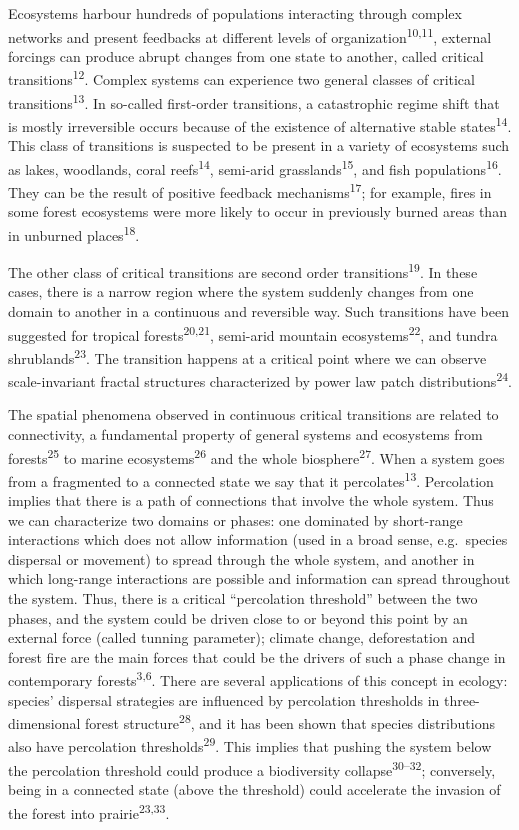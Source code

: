 \documentclass[]{article}
\begin{document}
Ecosystems harbour hundreds of populations interacting through complex
networks and present feedbacks at different levels of
organization\textsuperscript{10,11}, external forcings can produce
abrupt changes from one state to another, called critical
transitions\textsuperscript{12}. Complex systems can experience two
general classes of critical transitions\textsuperscript{13}. In
so-called first-order transitions, a catastrophic regime shift that is
mostly irreversible occurs because of the existence of alternative
stable states\textsuperscript{14}. This class of transitions is
suspected to be present in a variety of ecosystems such as lakes,
woodlands, coral reefs\textsuperscript{14}, semi-arid
grasslands\textsuperscript{15}, and fish
populations\textsuperscript{16}. They can be the result of positive
feedback mechanisms\textsuperscript{17}; for example, fires in some
forest ecosystems were more likely to occur in previously burned areas
than in unburned places\textsuperscript{18}.

The other class of critical transitions are second order
transitions\textsuperscript{19}. In these cases, there is a narrow
region where the system suddenly changes from one domain to another in a
continuous and reversible way. Such transitions have been suggested for
tropical forests\textsuperscript{20,21}, semi-arid mountain
ecosystems\textsuperscript{22}, and tundra
shrublands\textsuperscript{23}. The transition happens at a critical
point where we can observe scale-invariant fractal structures
characterized by power law patch distributions\textsuperscript{24}.

The spatial phenomena observed in continuous critical transitions are
related to connectivity, a fundamental property of general systems and
ecosystems from forests\textsuperscript{25} to marine
ecosystems\textsuperscript{26} and the whole
biosphere\textsuperscript{27}. When a system goes from a fragmented to a
connected state we say that it percolates\textsuperscript{13}.
Percolation implies that there is a path of connections that involve the
whole system. Thus we can characterize two domains or phases: one
dominated by short-range interactions which does not allow information
(used in a broad sense, e.g.~species dispersal or movement) to spread
through the whole system, and another in which long-range interactions
are possible and information can spread throughout the system. Thus,
there is a critical ``percolation threshold'' between the two phases,
and the system could be driven close to or beyond this point by an
external force (called tunning parameter); climate change, deforestation
and forest fire are the main forces that could be the drivers of such a
phase change in contemporary forests\textsuperscript{3,6}. There are
several applications of this concept in ecology: species' dispersal
strategies are influenced by percolation thresholds in three-dimensional
forest structure\textsuperscript{28}, and it has been shown that species
distributions also have percolation thresholds\textsuperscript{29}. This
implies that pushing the system below the percolation threshold could
produce a biodiversity collapse\textsuperscript{30--32}; conversely,
being in a connected state (above the threshold) could accelerate the
invasion of the forest into prairie\textsuperscript{23,33}.
\end{document}
